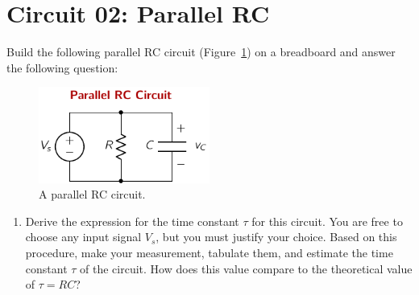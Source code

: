 \section{Circuit 02: Parallel RC}
Build the following parallel RC circuit (Figure~\ref{fig:expt01-02}) on a breadboard and answer the following question:
\begin{figure}[htbp]
    \centering
    \includegraphics[width=0.5\textwidth]{figures/expt01/expt01-02.pdf}
    \caption{A parallel RC circuit.}
    \label{fig:expt01-02}
\end{figure}
\begin{enumerate}
    \item Derive the expression for the time constant $\tau$ for this circuit. You are free to choose any input signal $V_s$, but you must justify your choice. Based on this procedure, make your measurement, tabulate them, and estimate the time constant $\tau$ of the circuit. How does this value compare to the theoretical value of $\tau = RC$?
\end{enumerate}

